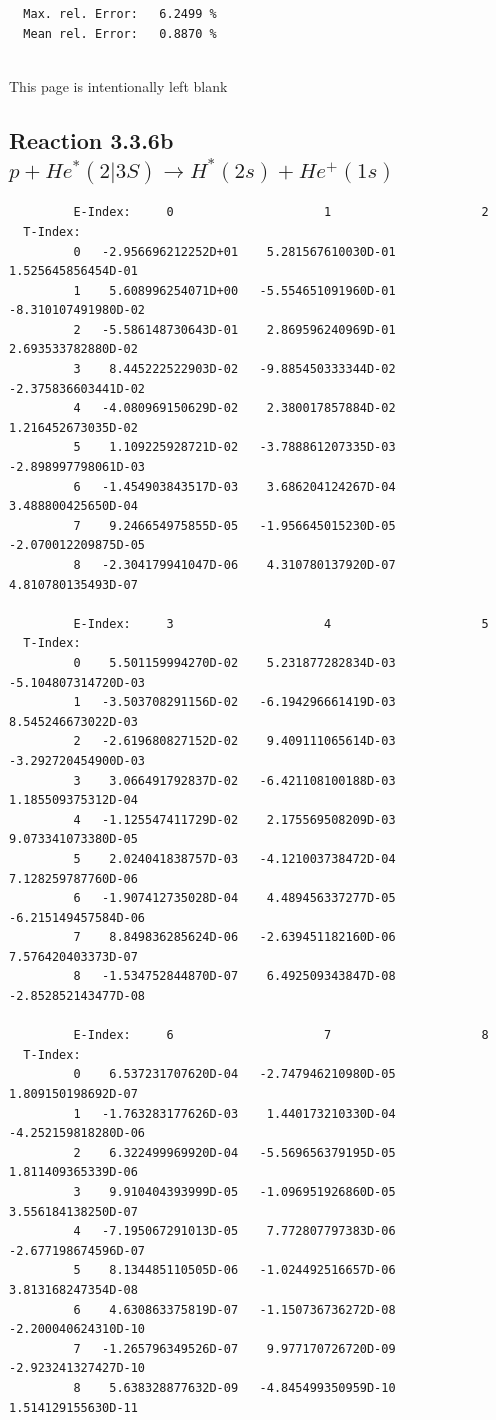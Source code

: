 \documentclass[12pt,dvips]{article}
\begin{document}
\begin{small}
\begin{verbatim}
  Max. rel. Error:   6.2499 %
  Mean rel. Error:   0.8870 %


\end{verbatim}\end{small}

\newpage
This page is intentionally left blank
\newpage

\subsection{
Reaction 3.3.6b  $  p + He^*(2|3S) \rightarrow H^*(2s) + He^+(1s)$
}


\begin{small}\begin{verbatim}
         E-Index:     0                     1                     2
  T-Index:
         0   -2.956696212252D+01    5.281567610030D-01    1.525645856454D-01
         1    5.608996254071D+00   -5.554651091960D-01   -8.310107491980D-02
         2   -5.586148730643D-01    2.869596240969D-01    2.693533782880D-02
         3    8.445222522903D-02   -9.885450333344D-02   -2.375836603441D-02
         4   -4.080969150629D-02    2.380017857884D-02    1.216452673035D-02
         5    1.109225928721D-02   -3.788861207335D-03   -2.898997798061D-03
         6   -1.454903843517D-03    3.686204124267D-04    3.488800425650D-04
         7    9.246654975855D-05   -1.956645015230D-05   -2.070012209875D-05
         8   -2.304179941047D-06    4.310780137920D-07    4.810780135493D-07

         E-Index:     3                     4                     5
  T-Index:
         0    5.501159994270D-02    5.231877282834D-03   -5.104807314720D-03
         1   -3.503708291156D-02   -6.194296661419D-03    8.545246673022D-03
         2   -2.619680827152D-02    9.409111065614D-03   -3.292720454900D-03
         3    3.066491792837D-02   -6.421108100188D-03    1.185509375312D-04
         4   -1.125547411729D-02    2.175569508209D-03    9.073341073380D-05
         5    2.024041838757D-03   -4.121003738472D-04    7.128259787760D-06
         6   -1.907412735028D-04    4.489456337277D-05   -6.215149457584D-06
         7    8.849836285624D-06   -2.639451182160D-06    7.576420403373D-07
         8   -1.534752844870D-07    6.492509343847D-08   -2.852852143477D-08

         E-Index:     6                     7                     8
  T-Index:
         0    6.537231707620D-04   -2.747946210980D-05    1.809150198692D-07
         1   -1.763283177626D-03    1.440173210330D-04   -4.252159818280D-06
         2    6.322499969920D-04   -5.569656379195D-05    1.811409365339D-06
         3    9.910404393999D-05   -1.096951926860D-05    3.556184138250D-07
         4   -7.195067291013D-05    7.772807797383D-06   -2.677198674596D-07
         5    8.134485110505D-06   -1.024492516657D-06    3.813168247354D-08
         6    4.630863375819D-07   -1.150736736272D-08   -2.200040624310D-10
         7   -1.265796349526D-07    9.977170726720D-09   -2.923241327427D-10
         8    5.638328877632D-09   -4.845499350959D-10    1.514129155630D-11


\end{verbatim}
\end{small}
\end{document}
